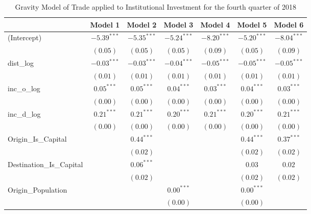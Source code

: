 \begin{table}
	\begin{center}
		\small
		\caption[Gravity Model of trade for Q4 2018]{Gravity Model of Trade applied to Institutional Investment for the fourth quarter of 2018}
		\begin{tabular}{l c c c c c c }
		\hline
		& Model 1 & Model 2 & Model 3 & Model 4 & Model 5 & Model 6 \\
		\hline
		(Intercept)                  & $-5.39^{***}$ & $-5.35^{***}$ & $-5.24^{***}$ & $-8.20^{***}$ & $-5.20^{***}$ & $-8.04^{***}$ \\
		& $(0.05)$      & $(0.05)$      & $(0.05)$      & $(0.09)$      & $(0.05)$      & $(0.09)$      \\
		dist\_log                    & $-0.03^{***}$ & $-0.03^{***}$ & $-0.04^{***}$ & $-0.05^{***}$ & $-0.05^{***}$ & $-0.05^{***}$ \\
		& $(0.01)$      & $(0.01)$      & $(0.01)$      & $(0.01)$      & $(0.01)$      & $(0.01)$      \\
		inc\_o\_log                  & $0.05^{***}$  & $0.05^{***}$  & $0.04^{***}$  & $0.03^{***}$  & $0.04^{***}$  & $0.03^{***}$  \\
		& $(0.00)$      & $(0.00)$      & $(0.00)$      & $(0.00)$      & $(0.00)$      & $(0.00)$      \\
		inc\_d\_log                  & $0.21^{***}$  & $0.21^{***}$  & $0.20^{***}$  & $0.21^{***}$  & $0.20^{***}$  & $0.21^{***}$  \\
		& $(0.00)$      & $(0.00)$      & $(0.00)$      & $(0.00)$      & $(0.00)$      & $(0.00)$      \\
		Origin\_Is\_Capital          &               & $0.44^{***}$  &               &               & $0.44^{***}$  & $0.37^{***}$  \\
		&               & $(0.02)$      &               &               & $(0.02)$      & $(0.02)$      \\
		Destination\_Is\_Capital     &               & $0.06^{***}$  &               &               & $0.03$        & $0.02$        \\
		&               & $(0.02)$      &               &               & $(0.02)$      & $(0.02)$      \\
		Origin\_Population           &               &               & $0.00^{***}$  &               & $0.00^{***}$  &               \\
		&               &               & $(0.00)$      &               & $(0.00)$      &               \\

\end{tabular}
\end{center}
\end{table}
